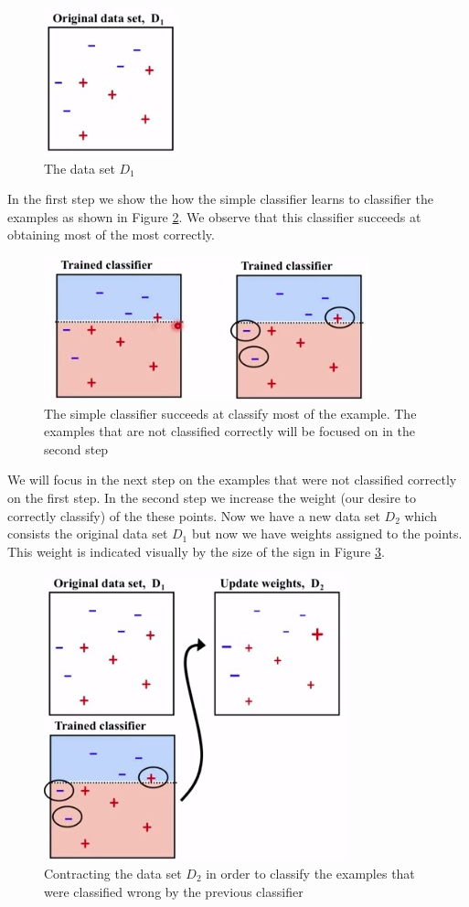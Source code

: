 \documentclass[11pt,oneside,reqno]{amsart}
\theoremstyle{definition}
\theoremstyle{definition}
\theoremstyle{remark}
\numberwithin{equation}{section}
\numberwithin{equation}{section}
\begin{document}
\begin{figure}[H]
  \centering
   {\includegraphics[scale=0.8]{boosting_1}
   \caption{The data set $D_1$}
  \label{adaboost}}
\end{figure}
In the first step we show the how the simple classifier learns to classifier the examples as shown in Figure \ref{adaboost1}. We observe that this classifier succeeds at obtaining most of the most correctly. 
\begin{figure}[H]
  \centering
   {\includegraphics[scale=0.8]{boosting_2}
   \caption{The simple classifier succeeds at classify most of the example. The examples that are not classified correctly will be focused on in the second step }
  \label{adaboost1}}
\end{figure}
We will focus in the next step on the examples that were not classified correctly on the first step. In the second step we increase the weight (our desire to correctly classify) of the these points. Now we have a new data set $D_2$ which consists the original data set $D_1$ but now we have weights assigned to the points. This weight is indicated visually by the size of the sign in Figure \ref{adaboost2}.
\begin{figure}[H]
  \centering
   {\includegraphics[scale=0.8]{boosting_3}
   \caption{Contracting the data set $D_2$ in order to classify the examples that were classified wrong by the previous classifier}
  \label{adaboost2}}
\end{figure}
\end{document}
